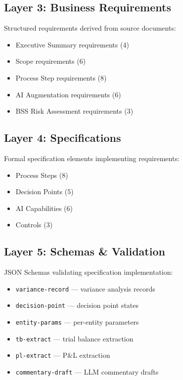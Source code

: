 \documentclass[11pt,a4paper,twoside]{report}
\newcommand{\schemaref}[1]{\texttt{#1}}
\begin{document}
\subsection{Layer 3: Business Requirements}

Structured requirements derived from source documents:
\begin{itemize}[noitemsep]
\item Executive Summary requirements (4)
\item Scope requirements (6)
\item Process Step requirements (8)
\item AI Augmentation requirements (6)
\item BSS Risk Assessment requirements (3)
\end{itemize}

\subsection{Layer 4: Specifications}

Formal specification elements implementing requirements:
\begin{itemize}[noitemsep]
\item Process Steps (8)
\item Decision Points (5)
\item AI Capabilities (6)
\item Controls (3)
\end{itemize}

\subsection{Layer 5: Schemas \& Validation}

JSON Schemas validating specification implementation:
\begin{itemize}[noitemsep]
\item \schemaref{variance-record} --- variance analysis records
\item \schemaref{decision-point} --- decision point states
\item \schemaref{entity-params} --- per-entity parameters
\item \schemaref{tb-extract} --- trial balance extraction
\item \schemaref{pl-extract} --- P\&L extraction
\item \schemaref{commentary-draft} --- LLM commentary drafts
\end{itemize}
\end{document}
